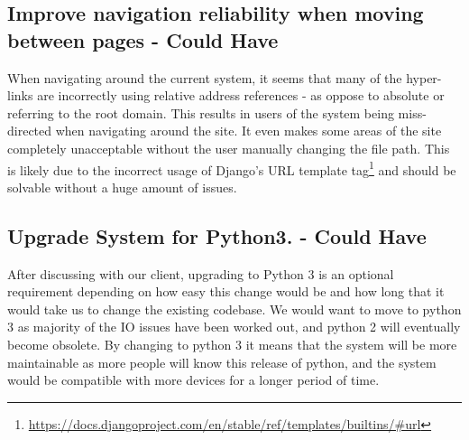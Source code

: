 \documentclass[12pt]{article}
\begin{document}
	\subsection{Improve navigation reliability when moving between pages - Could Have}
	When navigating around the current system, it seems that many of the hyper-links are incorrectly using relative address references - as oppose to absolute or referring to the root domain. This results in users of the system being miss-directed when navigating around the site. It even makes some areas of the site completely unacceptable without the user manually changing the file path.  This is likely due to the incorrect usage of Django's URL template tag\footnote{\url{https://docs.djangoproject.com/en/stable/ref/templates/builtins/#url}} and should be solvable without a huge amount of issues.
	\subsection{Upgrade System for Python3. - Could Have}
	After discussing with our client, upgrading to Python 3 is an optional requirement depending on how easy this change would be and how long that it would take us to change the existing codebase. 
We would want to move to python 3 as majority of the IO issues have been worked out, and python 2 will eventually become obsolete. By changing to python 3 it means that the system will be more maintainable as more people will know this release of python, and the system would be compatible with more devices for a longer period of time.
\end{document}
